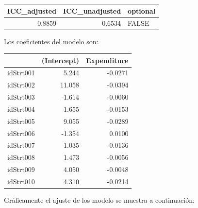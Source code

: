 \documentclass[
  12pt,
]{book}
\newenvironment{Shaded}{\begin{snugshade}}{\end{snugshade}}
\newcommand{\DataTypeTok}[1]{\textcolor[rgb]{0.13,0.29,0.53}{#1}}
\newcommand{\DecValTok}[1]{\textcolor[rgb]{0.00,0.00,0.81}{#1}}
\newcommand{\FunctionTok}[1]{\textcolor[rgb]{0.13,0.29,0.53}{\textbf{#1}}}
\newcommand{\NormalTok}[1]{#1}
\newcommand{\SpecialCharTok}[1]{\textcolor[rgb]{0.81,0.36,0.00}{\textbf{#1}}}
\begin{document}
\begin{tabular}{r|r|l}
\hline
ICC\_adjusted & ICC\_unadjusted & optional\\
\hline
0.8859 & 0.6534 & FALSE\\
\hline
\end{tabular}

Los coeficientes del modelo son:

\begin{Shaded}
\end{Shaded}

\begin{tabular}{l|r|r}
\hline
  & (Intercept) & Expenditure\\
\hline
idStrt001 & 5.244 & -0.0271\\
\hline
idStrt002 & 11.058 & -0.0394\\
\hline
idStrt003 & -1.614 & -0.0060\\
\hline
idStrt004 & 1.655 & -0.0153\\
\hline
idStrt005 & 9.055 & -0.0289\\
\hline
idStrt006 & -1.354 & 0.0100\\
\hline
idStrt007 & 1.035 & -0.0136\\
\hline
idStrt008 & 1.473 & -0.0056\\
\hline
idStrt009 & 4.050 & -0.0048\\
\hline
idStrt010 & 4.310 & -0.0214\\
\hline
\end{tabular}

Gráficamente el ajuste de los modelo se muestra a continuación:
\end{document}
